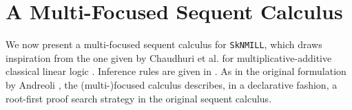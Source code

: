 \documentclass[runningheads]{llncs}
\newcommand{\tl}{\otimes \mathsf{L}}
\newcommand{\lright}{{\multimap}\mathsf{R}}
\newcommand{\lleft}{{\multimap}\mathsf{L}}
\newcommand{\pass}{\mathsf{pass}}
\newcommand{\unitl}{\mathsf{IL}}
\newcommand{\otL}{\tl}
\newcommand{\lolliR}{\lright}
\newcommand{\lolliL}{\lleft}
\newcommand{\IL}{\unitl}
\newcommand{\ax}{\mathsf{ax}}
\newcommand{\ot}{\otimes}
\newcommand{\lolli}{\multimap}
\newcommand{\I}{\mathsf{I}}
\newcommand{\SkNMILL}{\texttt{SkNMILL}}
\newcommand{\up}{\Uparrow}
\newcommand{\dn}{\Downarrow}
\newcommand{\focL}{\mathsf{foc_L}}
\newcommand{\foc}{\mathsf{foc}}
\newcommand{\focR}{\mathsf{foc_R}}
\newcommand{\unfoc}{\mathsf{unfoc}}
\begin{document}
\section{A Multi-Focused Sequent Calculus}\label{sec:focus}

We now present a multi-focused sequent calculus for \SkNMILL, which draws  inspiration from   the one given by Chaudhuri et al. for multiplicative-additive classical linear logic \cite{chaudhuri:canonical:2008}. Inference rules are given in . As in the original formulation by Andreoli \cite{andreoli:logic:1992}, the (multi-)focused calculus describes, in a declarative fashion, a root-first proof search strategy in the original sequent calculus.
\end{document}
